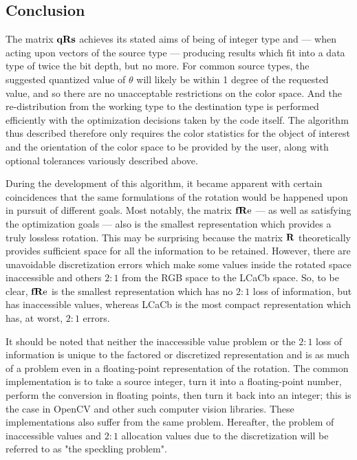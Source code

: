 \subsection{Conclusion}
The matrix $\qRs$ achieves its stated aims of being of integer type and --- when acting upon vectors of the source type --- producing results which fit into a data type of twice the bit depth, but no more. For common source types, the suggested quantized value of $\theta$ will likely be within 1 degree of the requested value, and so there are no unacceptable restrictions on the color space. And the re-distribution from the working type to the destination type is performed efficiently with the optimization decisions taken by the code itself. The algorithm thus described therefore only requires the color statistics for the object of interest and the orientation of the color space to be provided by the user, along with optional tolerances variously described above.

During the development of this algorithm, it became apparent with certain coincidences that the same formulations of the rotation would be happened upon in pursuit of different goals. Most notably, the matrix $\fRe$ --- as well as satisfying the optimization goals --- also is the smallest representation which provides a truly lossless rotation. This may be surprising because the matrix $\R$ theoretically provides sufficient space for all the information to be retained. However, there are unavoidable discretization errors which make some values inside the rotated space inaccessible and others $2:1$ from the RGB space to the LCaCb space. So, to be clear, $\fRe$ is the smallest representation which has no $2:1$ loss of information, but has inaccessible values, whereas LCaCb is the most compact representation which has, at worst, $2:1$ errors. 

It should be noted that neither the inaccessible value problem or the $2:1$ loss of information is unique to the factored or discretized representation and is as much of a problem even in a floating-point representation of the rotation. The common implementation is to take a source integer, turn it into a floating-point number, perform the conversion in floating points, then turn it back into an integer; this is the case in OpenCV and other such computer vision libraries. These implementations also suffer from the same problem. Hereafter, the problem of inaccessible values and $2:1$ allocation values due to the discretization will be referred to as "the speckling problem". 





